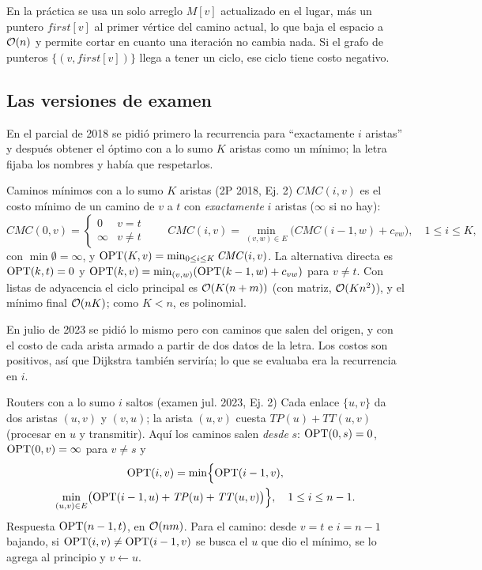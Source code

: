 En la práctica se usa un solo arreglo $M[v]$ actualizado en el lugar, más un
puntero $\mathit{first}[v]$ al primer vértice del camino actual, lo que baja el
espacio a $\mathcal{O}(n)$ y permite cortar en cuanto una iteración no cambia nada.
Si el grafo de punteros $\{(v,\mathit{first}[v])\}$ llega a tener un ciclo, ese ciclo
tiene costo negativo.

\subsection{Las versiones de examen}

En el parcial de 2018 se pidió primero la recurrencia para ``exactamente
$i$ aristas'' y después obtener el óptimo con a lo sumo $K$ aristas como un
mínimo; la letra fijaba los nombres y había que respetarlos.

\begin{problema}{Caminos mínimos con a lo sumo $K$ aristas (2P 2018, Ej. 2)}
$\mathit{CMC}(i,v)$ es el costo mínimo de un camino de $v$ a $t$ con
\emph{exactamente} $i$ aristas ($\infty$ si no hay):
\[
\mathit{CMC}(0,v)=\begin{cases}0&v=t\\ \infty&v\ne t\end{cases}\qquad
\mathit{CMC}(i,v)=\min_{(v,w)\in E}\bigl(\mathit{CMC}(i-1,w)+c_{vw}\bigr),\quad 1\le i\le K,
\]
con $\min\emptyset=\infty$, y
$\mathrm{OPT}(K,v)=\min_{0\le i\le K}\mathit{CMC}(i,v)$. La alternativa directa es
$\mathrm{OPT}(k,t)=0$ y $\mathrm{OPT}(k,v)=\min_{(v,w)}(\mathrm{OPT}(k-1,w)+c_{vw})$ para $v\ne t$.
Con listas de adyacencia el ciclo principal es $\mathcal{O}(K(n+m))$ (con matriz,
$\mathcal{O}(Kn^2)$), y el mínimo final $\mathcal{O}(nK)$; como $K<n$, es polinomial.
\end{problema}

En julio de 2023 se pidió lo mismo pero con caminos que salen del origen, y
con el costo de cada arista armado a partir de dos datos de la letra. Los
costos son positivos, así que Dijkstra también serviría; lo que se evaluaba
era la recurrencia en $i$.

\begin{problema}{Routers con a lo sumo $i$ saltos (examen jul. 2023, Ej. 2)}
Cada enlace $\{u,v\}$ da dos aristas $(u,v)$ y $(v,u)$; la arista $(u,v)$
cuesta $\mathit{TP}(u)+\mathit{TT}(u,v)$ (procesar en $u$ y transmitir). Aquí los caminos
salen \emph{desde} $s$: $\mathrm{OPT}(0,s)=0$, $\mathrm{OPT}(0,v)=\infty$ para $v\ne s$ y
\begin{multline*}
\mathrm{OPT}(i,v)=\min\Bigl\{\mathrm{OPT}(i-1,v),\\ \min_{(u,v)\in E}\bigl(\mathrm{OPT}(i-1,u)+\mathit{TP}(u)+\mathit{TT}(u,v)\bigr)\Bigr\},\quad 1\le i\le n-1.
\end{multline*}
Respuesta $\mathrm{OPT}(n-1,t)$, en $\mathcal{O}(nm)$. Para el camino: desde $v=t$ e $i=n-1$
bajando, si $\mathrm{OPT}(i,v)\ne\mathrm{OPT}(i-1,v)$ se busca el $u$ que dio el mínimo, se
lo agrega al principio y $v\gets u$.
\end{problema}


